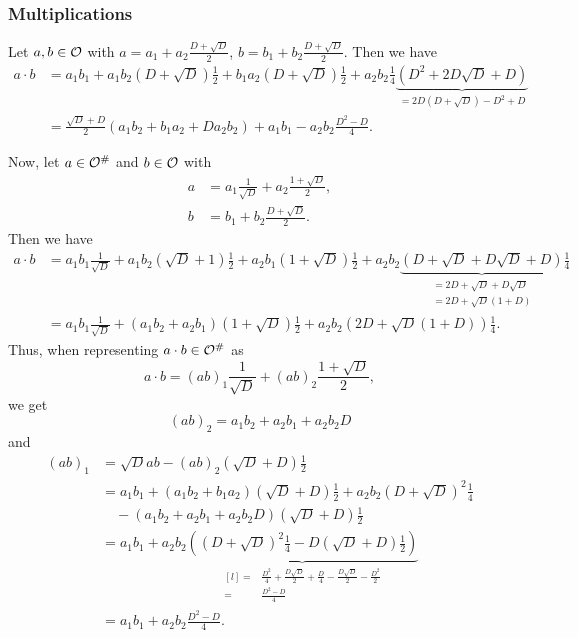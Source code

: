 \subsubsection{Multiplications}
\label{curlOmultiplications}
Let $a,b \in \mathcal{O}$ with $a = a_1 + a_2 \frac{D + \sqrt{D}} {2}$, $b = b_1 + b_2 \frac{D + \sqrt{D}} {2}$. Then we have
\begin{align*}
a \cdot b &= a_1 b_1 + a_1 b_2 (D + \sqrt{D}) \tfrac{1}{2} + b_1 a_2 (D + \sqrt{D}) \tfrac{1}{2}
+ a_2 b_2 \tfrac{1}{4} \underbrace{(D^2 + 2 D \sqrt{D} + D)}_{= 2D (D + \sqrt{D}) - D^2 + D} \\
&= \frac{\sqrt{D} + D}{2} (a_1 b_2 + b_1 a_2 + D a_2 b_2)
+ a_1 b_1 - a_2 b_2 \frac{D^2 - D}{4} .
\end{align*}

Now, let $a \in \mathcal{O}^\#$ and $b \in \mathcal{O}$ with
\begin{align*}
a &= a_1 \frac{1}{\sqrt{D}} + a_2 \frac{1 + \sqrt{D}} {2} , \\
b &= b_1 + b_2 \frac{D + \sqrt{D}} {2} .
\end{align*}
Then we have
\begin{align*}
a \cdot b &= a_1 b_1 \tfrac{1}{\sqrt{D}} + a_1 b_2 (\sqrt{D} + 1) \tfrac{1}{2}
+ a_2 b_1 (1 + \sqrt{D}) \tfrac{1}{2} + a_2 b_2
\underbrace{(D + \sqrt{D} + D \sqrt{D} + D)}_{
\begin{aligned}
= 2D + \sqrt{D} + D \sqrt{D} \\
= 2D + \sqrt{D} (1 + D)
\end{aligned}
}
\tfrac{1}{4} \\
&= a_1 b_1 \tfrac{1}{\sqrt{D}} + (a_1 b_2 + a_2 b_1) (1 + \sqrt{D}) \tfrac{1}{2}
+ a_2 b_2 (2D + \sqrt{D}(1 + D)) \tfrac{1}{4} .
\end{align*}
Thus, when representing $a \cdot b \in \mathcal{O}^\#$ as
\[ a \cdot b = (ab)_1 \frac{1}{\sqrt{D}} + (ab)_2 \frac{1 + \sqrt{D}} {2} , \]
we get
\[ (ab)_2 = a_1 b_2 + a_2 b_1 + a_2 b_2 D \]
and
\begin{align*}
(ab)_1 &= \sqrt{D} ab - (ab)_2 (\sqrt{D} + D) \tfrac{1}{2} \\
&= a_1 b_1 + (a_1 b_2 + b_1 a_2) (\sqrt{D} + D) \tfrac{1}{2} + a_2 b_2 (D + \sqrt{D})^2 \tfrac{1}{4} \\
&\quad - (a_1 b_2 + a_2 b_1 + a_2 b_2 D) (\sqrt{D} + D) \tfrac{1}{2} \\
&= a_1 b_1 + a_2 b_2 \underbrace{( (D+\sqrt{D})^2 \tfrac{1}{4} - D(\sqrt{D}+D)\tfrac{1}{2} )}_{
\begin{aligned}[l]
=& \tfrac{D^2}{4} + \tfrac{D\sqrt{D}}{2} + \tfrac{D}{4} - \tfrac{D\sqrt{D}}{2} - \tfrac{D^2}{2} \\
=& \tfrac{D^2 - D}{4}
\end{aligned}
} \\
&= a_1 b_1 + a_2 b_2 \frac{D^2 - D}{4} .
\end{align*}

